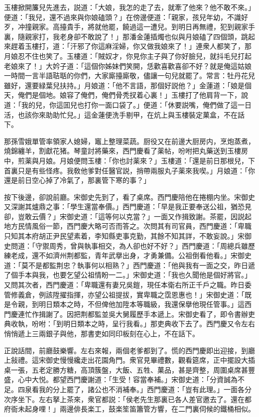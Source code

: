 玉樓掀開簾兒先進去，説道：「大娘，我怎的走了去，就牽了他來？他不敢不來。」便道：「我兒，還不過來與你娘磕頭？」在傍邊便道：「親家，孩兒年幼，不識好歹，冲撞親家。高擡貴手，將就他罷，饒過這一遭兒。到明日再無禮，犯到親家手裏，隨親家打，我老身卻不敢說了！」那潘金蓮插燭也似與月娘磕了四個頭，跳起來趕着玉樓打，道：「汗邪了你這麻淫婦，你又做我娘來了！」連衆人都笑了，那月娘忍不住也笑了。玉樓道：「賊奴才，你見你主子與了你好臉兒，就抖毛兒打起老娘來了！」大妗子道：「這個你姊妹們笑開，恁歡喜歡喜卻不好？就是俺這姑娘一時間一言半語聐聒的你們，大家廝擡廝敬，儘讓一句兒就罷了。常言：牡丹花兒雖好，還要緑葉兒扶持。」月娘道：「他不言語，那個好説他？」金蓮道：「娘是個天，俺們是個地。娘容了俺們，俺們骨秃扠着心裏！」玉樓打了他肩背一下，說道：「我的兒，你這囬兒也打你一面口袋了。」便道：「休要説嘴，俺們做了這一日活，也該你來助助忙兒。」這金蓮便洗手剔甲，在炕上與玉樓裝定菓盒，不在話下。

那孫雪娥單管率領家人媳婦，竈上整理菜蔬。厨役又在前邊大厨房内，烹炮蒸煮，燒錦纏羊，割獻花猪。琴童討將藥來，西門慶看了薬帖，吩咐把丸藥送到玉樓房中，煎薬與月娘。月娘便問玉樓：「你也討薬來？」玉樓道：「還是前日那根兒，下首裏只是有些怪疼。我敎他爹對任醫官説，捎帶兩服丸子薬來我喫。」月娘道：「你還是前日空心掉了冷氣了，那裏管下寒的事？」

按下後邊，卻說前廳。宋御史先到了，看了桌席。西門慶陪他在捲棚内坐。宋御史又深謝其爐鼎之事：「學生還當奉價。」西門慶道：「早是我正要奉送公祖，猶恐見卻，豈敢云價？」宋御史道：「這等何以克當？」一面又作揖致謝。茶罷，因説起地方民情風俗一節，西門慶大略可否而答之。次問其有司官員，西門慶道：「卑職只知其本府胡正尹民望素着，李知縣吏事克勤，其餘不知其詳，不敢妄說。」宋御史問道：「守禦周秀，曾與執事相交，為人卻也好不好？」西門慶道：「周總兵雖歷練老成，還不如濟州荆都監，青年武擧出身，才勇兼備。公祖倒看他看。」宋御史道：「莫不是都監荆忠？執事何以相熟？」西門慶道：「他與我有一面之交，昨日遞了個手本與我，也要乞望公祖情盼一二。」宋御史道：「我也久聞他是個好將官。」又問其次者，西門慶道：「卑職還有妻兄吳鎧，現任本衛右所正千戶之職。昨日委管修義倉，例該陞擢指揮，亦望公祖提拔，實卑職之霑恩惠也！」宋御史道：「既是令親，到明日類本之時，不但俾他加陞本等職級，我還保擧他現任管事。」這西門慶連忙作揖謝了。因把荆都監並吳大舅履歷手本遞上。宋御史看了，即令書辦吏典收執，吩咐：「到明日類本之時，呈行我看。」那吏典收下去了。西門慶又令左右悄悄遞上三兩銀子與他，那書吏如同印板刻在心上，不在話下。

正說話間，前廳鼓樂響。左右來報，兩個老爹都到了。慌的西門慶即出迎接，到廳上敍禮。這宋御史慢慢纔走出花園角門。衆官見畢禮數，觀看筵席，正中擺設大插桌一張，五老定勝方糖，高頂簇盤，大飯、五牲、菓品，甚是齊整，周圍桌席甚豐盛，心中大悦。都望西門慶謝道：「生受！容當奉補。」宋御史道：「分資誠為不足。四泉看我的分上罷了，諸公也不消補奉。」西門慶道：「豈有此理。」一面各分次序坐下。左右拏上茶來，衆官都説：「侯老先生那裏已各人差官邀去了。還在都府衙未起身哩！」兩邊俳長楽工，鼓楽笙笛簫管方響，在二門裏伺候的鐵桶相似。

